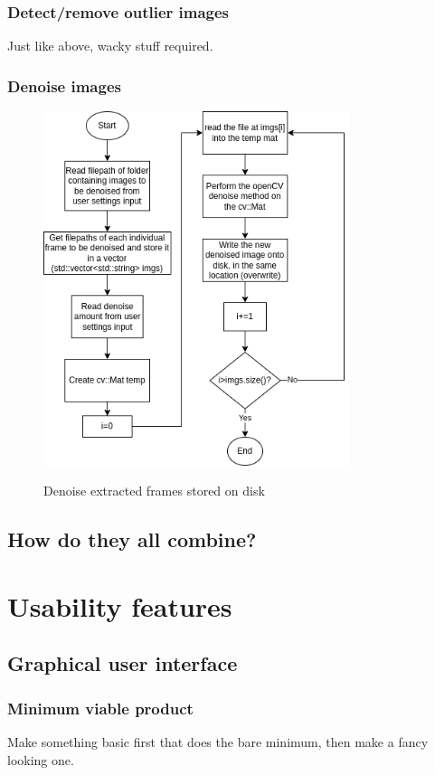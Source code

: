 \documentclass[11pt]{report}
\begin{document}
\subsubsection{Detect/remove outlier images}
Just like above, wacky stuff required.
\subsubsection{Denoise images}
\begin{figure}[h!]
	\centering
	\caption{Denoise extracted frames stored on disk}
	\includegraphics[width=0.8\textwidth]{designDiagrams/denoiseImages}
	\label{fig:denoiseImages}
\end{figure}
\subsection{How do they all combine?}


\section{Usability features}
\subsection{Graphical user interface}
\subsubsection{Minimum viable product}
Make something basic first that does the bare minimum, then make a fancy looking one.
\end{document}
